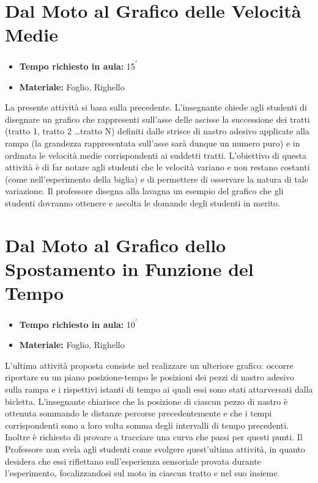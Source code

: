 \documentclass{report} \usepackage[T1]{fontenc} \usepackage[italian]{babel}
\begin{document}
\section{Dal Moto al Grafico delle Velocità Medie}
\begin{itemize}
\item \textbf{Tempo richiesto in aula:} 15\textsuperscript{$\prime$}
\item \textbf{Materiale:} Foglio, Righello
\end{itemize}

La presente attività si basa sulla precedente.
L’insegnante chiede agli studenti di disegnare un grafico che rappresenti sull'asse
delle ascisse
la successione dei tratti (tratto 1, tratto 2 \dots tratto N) definiti
dalle strisce di nastro adesivo applicate alla rampa
(la grandezza rappresentata sull'asse sarà dunque un numero puro) e
in ordinata le velocità medie corrispondenti ai suddetti tratti. L'obiettivo
di questa attività è di far notare agli studenti che le velocità variano e non
restano costanti (come nell'esperimento della biglia) e di permettere di osservare
la natura di tale variazione.
Il professore disegna alla lavagna un esempio del grafico che gli studenti
dovranno ottenere e ascolta le domande degli studenti in merito.

\section{Dal Moto al Grafico dello Spostamento in Funzione del Tempo}

\begin{itemize}
\item \textbf{Tempo richiesto in aula:} 10\textsuperscript{$\prime$}
\item \textbf{Materiale:} Foglio, Righello
\end{itemize}

L’ultima attività proposta consiste nel realizzare un ulteriore grafico:
occorre riportare su un piano posizione-tempo le
posizioni dei pezzi di nastro adesivo sulla rampa e i rispettivi istanti di
tempo ai quali essi sono stati attarversati dalla bicletta. L’insegnante
chiarisce che la posizione di ciascun pezzo di nastro è
ottenuta sommando le distanze percorse precedentemente e che i tempi
corrispondenti sono a loro volta somma degli intervalli di tempo precedenti.
Inoltre è richiesto di provare a tracciare una curva che passi per questi
punti. Il Professore non svela agli studenti come svolgere quest’ultima
attività, in quanto desidera che essi riflettano sull'esperienza sensoriale
provata durante l’esperimento, focalizzandosi sul moto in ciascun
tratto e nel suo insieme.
\end{document}
